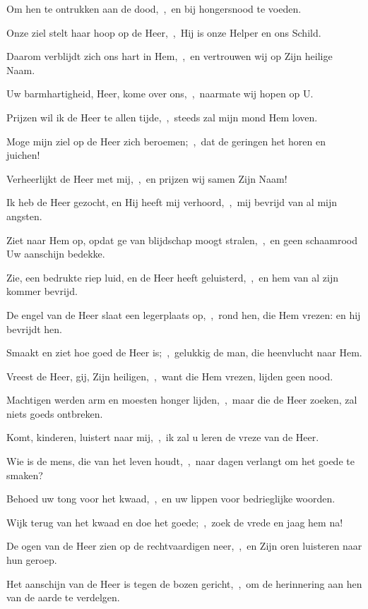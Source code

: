 \documentclass[12pt,twoside,a5paper]{article}
\begin{document}
\begin{halfparskip}
  Om hen te ontrukken aan de dood,~\sep\ en bij hongersnood te voeden.

  Onze ziel stelt haar hoop op de Heer,~\sep\ Hij is onze Helper en ons Schild.

  Daarom verblijdt zich ons hart in Hem,~\sep\ en vertrouwen wij op Zijn heilige Naam.

  Uw barmhartigheid, Heer, kome over ons,~\sep\ naarmate wij hopen op U.

   Prijzen wil ik de Heer te allen tijde,~\sep\ steeds zal mijn mond Hem loven.

  Moge mijn ziel op de Heer zich beroemen;~\sep\ dat de geringen het horen en juichen!

  Verheerlijkt de Heer met mij,~\sep\ en prijzen wij samen Zijn Naam!

  Ik heb de Heer gezocht, en Hij heeft mij verhoord,~\sep\ mij bevrijd van al mijn angsten.

  Ziet naar Hem op, opdat ge van blijdschap moogt stralen,~\sep\ en geen schaamrood Uw aanschijn bedekke.

  Zie, een bedrukte riep luid, en de Heer heeft geluisterd,~\sep\ en hem van al zijn kommer bevrijd.

  De engel van de Heer slaat een legerplaats op,~\sep\ rond hen, die Hem vrezen: en hij bevrijdt hen.

  Smaakt en ziet hoe goed de Heer is;~\sep\ gelukkig de man, die heenvlucht naar Hem.

  Vreest de Heer, gij, Zijn heiligen,~\sep\ want die Hem vrezen, lijden geen nood.

  Machtigen werden arm en moesten honger lijden,~\sep\ maar die de Heer zoeken, zal niets goeds ontbreken.

  Komt, kinderen, luistert naar mij,~\sep\ ik zal u leren de vreze van de Heer.

  Wie is de mens, die van het leven houdt,~\sep\ naar dagen verlangt om het goede te smaken?

  Behoed uw tong voor het kwaad,~\sep\ en uw lippen voor bedrieglijke woorden.

  Wijk terug van het kwaad en doe het goede;~\sep\ zoek de vrede en jaag hem na!

  De ogen van de Heer zien op de rechtvaardigen neer,~\sep\ en Zijn oren luisteren naar hun geroep.

  Het aanschijn van de Heer is tegen de bozen gericht,~\sep\ om de herinnering aan hen van de aarde te verdelgen.


\end{halfparskip}
\end{document}
